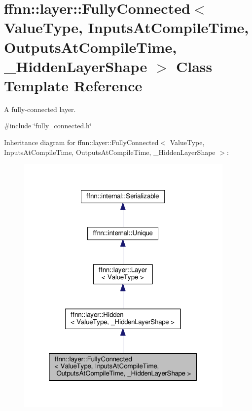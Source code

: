 \hypertarget{classffnn_1_1layer_1_1_fully_connected}{\section{ffnn\-:\-:layer\-:\-:Fully\-Connected$<$ Value\-Type, Inputs\-At\-Compile\-Time, Outputs\-At\-Compile\-Time, \-\_\-\-Hidden\-Layer\-Shape $>$ Class Template Reference}
\label{classffnn_1_1layer_1_1_fully_connected}
}


A fully-\/connected layer.  




{\ttfamily \#include \char`\"{}fully\-\_\-connected.\-h\char`\"{}}



Inheritance diagram for ffnn\-:\-:layer\-:\-:Fully\-Connected$<$ Value\-Type, Inputs\-At\-Compile\-Time, Outputs\-At\-Compile\-Time, \-\_\-\-Hidden\-Layer\-Shape $>$\-:\nopagebreak
\begin{figure}[H]
\begin{center}
\leavevmode
\includegraphics[width=302pt]{classffnn_1_1layer_1_1_fully_connected__inherit__graph}
\end{center}
\end{figure}


